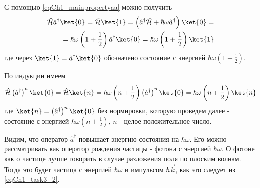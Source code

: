 С помощью \eqref{eqCh1_mainpropertyaa} можно получить
\begin{eqnarray}
\hat{\mathcal{H}} \hat{a}^{\dag}\ket{0} = 
\hat{\mathcal{H}} \ket{1} =
\left(\hat{a}^{\dag} \hat{\mathcal{H}} + \hbar \omega \hat{a}^{\dag} \right)
\ket{0} = 
\nonumber \\
= \hbar \omega \left(1 + \frac{1}{2}\right)
\hat{a}^{\dag} \ket{0} = 
\hbar \omega \left(1 + \frac{1}{2}\right)
\ket{1}
\end{eqnarray}
где через $\ket{1} = \hat{a}^{\dag} \ket{0}$ обозначено
состояние с энергией $\hbar \omega \left(1 + \frac{1}{2}\right)$.

По индукции имеем
\begin{equation}
\hat{\mathcal{H}} \left(\hat{a}^{\dag}\right)^n\ket{0} = 
\hat{\mathcal{H}} \ket{n} 
= \hbar \omega \left(n + \frac{1}{2}\right)
\left(\hat{a}^{\dag}\right)^n\ket{0} = 
\hbar \omega \left(n + \frac{1}{2}\right)
\ket{n}
\label{eqCh1_aplusinduction}
\end{equation}
где
$\ket{n} = \left(\hat{a}^{\dag}\right)^n\ket{0}$   
без нормировки, которую проведем далее -  состояние с энергией  
$\hbar \omega \left(n + \frac{1}{2}\right)$,  $n$  -  целое
положительное число.

Видим, что оператор  $\hat{a}^{\dag}$  повышает энергию состояния на
$\hbar \omega$.  Его можно рассматривать как оператор рождения частицы
- фотона  с энергией  $\hbar \omega$.  О фотоне как о частице лучше
говорить в случае разложения поля по плоским волнам. Тогда это будет
частица с энергией $\hbar \omega$ и импульсом $\hbar \vec{k}$,  как
это следует из \eqref{eqCh1_task3_2}. 
  

